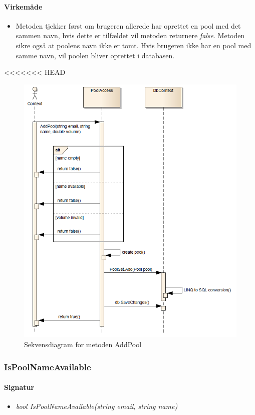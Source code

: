 \paragraph{Virkemåde}
\begin{itemize}
	\item Metoden tjekker først om brugeren allerede har oprettet en pool med det sammen navn, hvis dette er tilfældet vil metoden returnere \textit{false}. Metoden sikre også at poolens navn ikke er tomt. Hvis brugeren ikke har en pool med samme navn, vil poolen bliver oprettet i databasen.
\end{itemize}

<<<<<<< HEAD
\begin{figure}
\centering
\includegraphics[width=0.7\linewidth]{figs/dbSeq/addPool}
\caption{Sekvensdiagram for metoden AddPool}
\label{fig:addPool}
\end{figure}




\subsubsection{IsPoolNameAvailable}%






\paragraph{Signatur}
\begin{itemize}
	\item \textit{bool IsPoolNameAvailable(string email, string name)}
\end{itemize}

